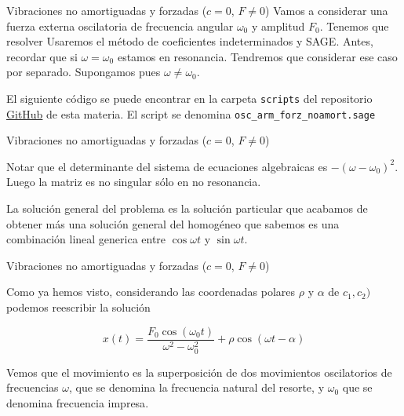\documentclass[handout,hyperref={colorlinks=true}]{beamer}
\renewcommand{\emph}[1]{\textcolor[rgb]{1,0,0}{#1}}
\begin{document}
\begin{frame}{ Vibraciones no amortiguadas y forzadas ($c=0$, $F\neq 0$) }
Vamos a considerar una fuerza externa oscilatoria de frecuencia angular $\omega_0$ y amplitud $F_0$. Tenemos que resolver
Usaremos el método de coeficientes indeterminados y SAGE. Antes, recordar que si $\omega=\omega_0$ estamos en 
resonancia. Tendremos que considerar ese caso por separado. Supongamos pues $\omega\neq\omega_0$.

El siguiente código se puede encontrar en la carpeta \texttt{scripts} del repositorio 
\href{https://github.com/fdmazzone/Ecuaciones_Diferenciales}{GitHub} de esta  materia. El script se denomina \texttt{osc\_arm\_forz\_noamort.sage} 
 

\end{frame}



\begin{frame}{ Vibraciones no amortiguadas y forzadas ($c=0$, $F\neq 0$) }
 

 
Notar que el determinante del sistema de ecuaciones algebraicas es $-(\omega-\omega_0)^2$. Luego la matriz 
es no singular sólo en no resonancia. 

La solución general del problema es la solución particular que acabamos de obtener más una solución 
general del homogéneo que sabemos es una combinación lineal generica entre $\cos \omega t$ y $\sin \omega t$.


 
 
\end{frame}

\begin{frame}{ Vibraciones no amortiguadas y forzadas ($c=0$, $F\neq 0$) }

Como ya hemos visto, considerando las coordenadas polares $\rho$ y $\alpha$ de $c_1,c_2)$
podemos reescribir la solución 


\[x(t)=\frac{F_{0} \cos\left(\omega_{0} t\right)}{\omega^{2} - \omega_{0}^{2}}+
\rho\cos(\omega t-\alpha)
\]

Vemos que el movimiento es la superposición de dos movimientos oscilatorios de frecuencias $\omega$, que se
denomina la \emph{frecuencia natural} del resorte, y $\omega_0$ que se denomina \emph{frecuencia impresa}.
 
\end{frame}
\end{document}
